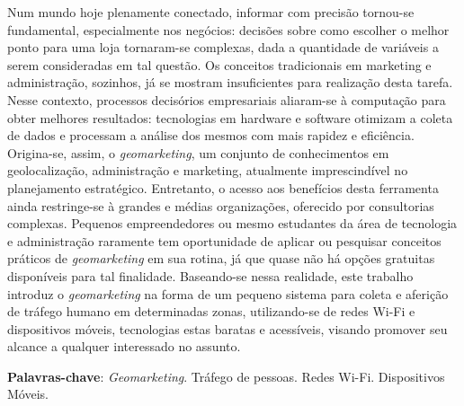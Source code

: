 \documentclass[
		12pt,				%
		openright,			%
		oneside,			%
		a4paper,			%
		chapter=TITLE,		%
		english,			%
		brazil				%
	]{abntex2}
\newif\iffinal
\newif\ifresumo
\begin{document}







\ifresumo
	\setlength{\absparsep}{18pt} %
	\begin{resumo}
			Num mundo hoje plenamente conectado, informar com precisão tornou-se fundamental, especialmente nos negócios: decisões sobre como escolher o melhor ponto para uma loja tornaram-se complexas, dada a quantidade de variáveis a serem consideradas em tal questão. Os conceitos tradicionais em marketing e administração, sozinhos, já se mostram insuficientes para realização desta tarefa. Nesse contexto, processos decisórios empresariais aliaram-se à computação para obter melhores resultados: tecnologias em hardware e software otimizam a coleta de dados e processam a análise dos mesmos com mais rapidez e eficiência. Origina-se, assim, o \emph{geomarketing}, um conjunto de conhecimentos em geolocalização, administração e marketing, atualmente imprescindível no planejamento estratégico. Entretanto, o acesso aos benefícios desta ferramenta ainda restringe-se à grandes e médias organizações, oferecido por consultorias complexas. Pequenos empreendedores ou mesmo estudantes da área de tecnologia e administração raramente tem oportunidade de aplicar ou pesquisar conceitos práticos de \emph{geomarketing} em sua rotina, já que quase não há opções gratuitas disponíveis para tal finalidade. Baseando-se nessa realidade, este trabalho introduz o \emph{geomarketing} na forma de um pequeno sistema para coleta e aferição de tráfego humano em determinadas zonas, utilizando-se de redes Wi-Fi e dispositivos móveis, tecnologias estas baratas e acessíveis, visando promover seu alcance a qualquer interessado no assunto.

		\textbf{Palavras-chave}: \emph{Geomarketing}. Tráfego de pessoas. Redes Wi-Fi. Dispositivos Móveis.

	\end{resumo}
\end{document}
